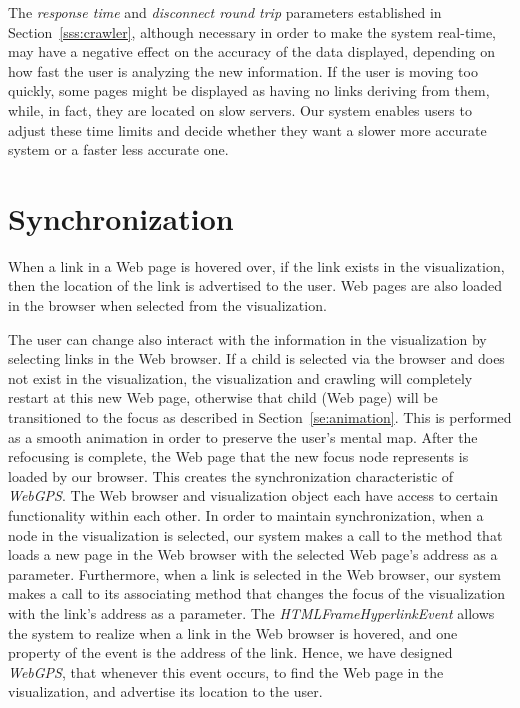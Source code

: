 \documentclass[10pt,psfig]{article}
\begin{document}
{The {\em response time} and {\em disconnect round trip} parameters established in Section~\ref{sss:crawler}, although necessary in order to make the system real-time, may have a negative effect on the accuracy of the data displayed, depending on how fast the user is analyzing the new information.  If the user is moving too quickly, some pages might be displayed as having no links deriving from them, while, in fact, they are located on slow servers.
Our system enables users to adjust these time limits and decide whether they want a slower more accurate system or a faster less accurate one.

\section{Synchronization}
\label{se:synch}

When a link in a Web page is hovered over, if the link exists in the visualization, then the location of the link is advertised to the user.
Web pages are also loaded in the browser when selected from the visualization.

The user can change also interact with the information in the visualization by selecting links in the Web browser.
If a child is selected via the browser and does not exist in the visualization, the visualization and crawling will completely restart at this new Web page,
otherwise that child (Web page) will be transitioned to the focus as described in Section~\ref{se:animation}.
This is performed as a smooth animation in order to preserve the user's mental map.
After the refocusing is complete, the Web page that the new focus node represents is loaded by our browser.
This creates the synchronization characteristic of {\em WebGPS}.
The Web browser and visualization object each have access to certain functionality within each other.
In order to maintain synchronization, when a node in the visualization is selected, our system makes a call to the method that loads a new page in the Web browser with the selected Web page's address as a parameter.
Furthermore, when a link is selected in the Web browser, our system makes a call to its associating method that changes the focus of the visualization with the link's address as a parameter.
The {\em HTMLFrameHyperlinkEvent} allows the system to realize when a link in the Web browser is hovered, and one property of the event is the address of the link.  Hence, we have designed {\em WebGPS}, that whenever this event occurs, to find the Web page in the visualization, and advertise its location to the user.

}
\end{document}
